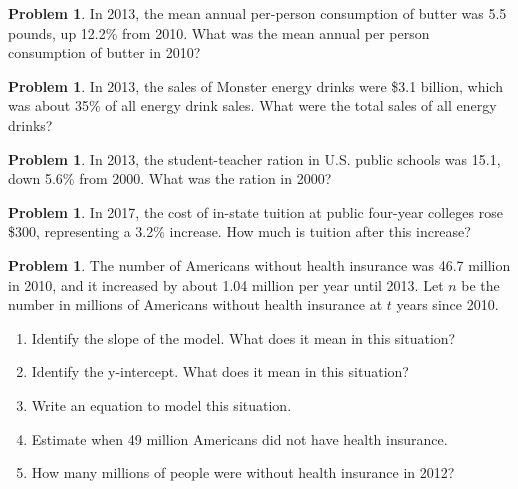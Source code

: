 \documentclass[11pt]{scrartcl}
\theoremstyle{definition}
\newtheorem{problem}[theorem]{Problem}
\begin{document}
\begin{problem}
	In 2013, the mean annual per-person consumption of butter was 5.5 pounds, up 12.2\% from 2010. What was the mean annual per person consumption of butter in 2010?
\end{problem}

\begin{problem}
	In 2013, the sales of Monster energy drinks were \$3.1 billion, which was about 35\% of all energy drink sales. What were the total sales of all energy drinks?
\end{problem}

\begin{problem}
	In 2013, the student-teacher ration in U.S. public schools was 15.1, down 5.6\% from 2000. What was the ration in 2000?
\end{problem}

\begin{problem}
	In 2017, the cost of in-state tuition at public four-year colleges rose \$300, representing a 3.2\% increase. How much is tuition after this increase?
\end{problem}

\begin{problem}
	The number of Americans without health insurance was 46.7 million in 2010, and it increased by about 1.04 million per year until 2013. Let $n$ be the number in millions of Americans without health insurance at $t$ years since 2010.
	\begin{enumerate}[label=\alph*)]
		\item Identify the slope of the model. What does it mean in this situation?
		\item Identify the y-intercept. What does it mean in this situation?
		\item Write an equation to model this situation.
		\item Estimate when 49 million Americans did not have health insurance.
		\item How many millions of people were without health insurance in 2012?
	\end{enumerate}
\end{problem}

\vspace{4mm}
\end{document}
